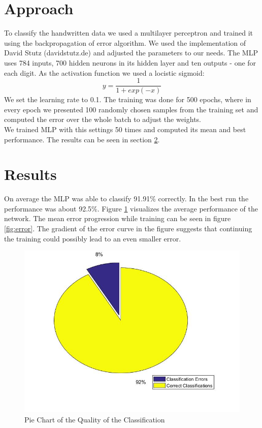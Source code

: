 \documentclass[paper=a4, fontsize=11pt]{scrartcl} %
\numberwithin{equation}{section} %
\numberwithin{figure}{section} %
\numberwithin{table}{section} %
\begin{document}
\section{Approach}
To classify the handwritten data we used a multilayer perceptron and trained it using the backpropagation of error algorithm. We used the implementation of David Stutz (davidstutz.de) and adjusted the parameters to our needs.
The MLP uses 784 inputs, 700 hidden neurons in its hidden layer and ten outputs - one for each digit.
As the activation function we used a locistic sigmoid:
\[ y = \frac{1}{1+exp(-x)}\]
We set the learning rate to 0.1. The training was done for 500 epochs, where in every epoch we presented 100 randomly chosen samples from the training set and computed the error over the whole batch to adjust the weights.\\
We trained MLP with this settings 50 times and computed its mean and best performance. The results can be seen in section \ref{sec:results}.

\section{Results}
\label{sec:results}

On average the MLP was able to classify 91.91\% correctly. In the best run the performance was about 92.5\%. Figure \ref{fig:pie} visualizes the average performance of the network. The mean error progression while training can be seen in figure \ref{fig:error}. The gradient of the error curve in the figure suggests that continuing the training could possibly lead to an even smaller error. 

\begin{figure}[H]
	\centering
	\includegraphics[width = 0.6\linewidth]{./pieChart.jpg}
	\caption{Pie Chart of the Quality of the Classification}
	\label{fig:pie}
\end{figure}
\end{document}
